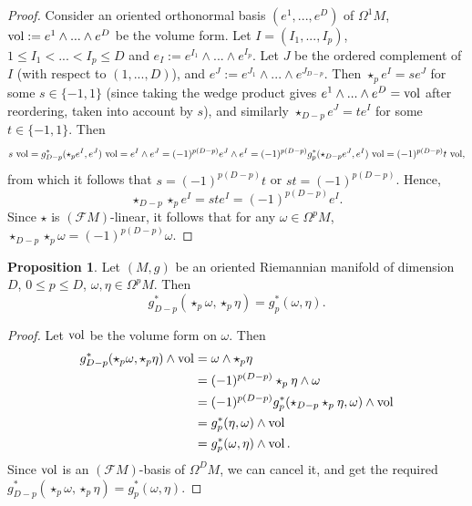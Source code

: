 \documentclass{elsarticle}
\theoremstyle{definition}
\newtheorem{proposition}[theorem]{Proposition}
\newcommand{\vol}{\mathop{\rm vol}\nolimits}
\begin{document}
\begin{proof}
  Consider an oriented orthonormal basis $(e^1, ..., e^D)$ of $\Omega^1 M$, $\vol := e^1 \wedge ... \wedge e^D$ be the volume form.
  Let $I = (I_1, ..., I_p)$, $1 \leq I_1 < ... < I_p \leq D$ and $e_I := e^{I_1} \wedge ... \wedge e^{I_p}$.
  Let $J$ be the ordered complement of $I$ (with respect to $(1, ..., D)$),
  and $e^J := e^{J_1} \wedge ... \wedge e^{J_{D - p}}$.
  Then $\star_p e^I = s e^J$ for some $s \in \{-1, 1\}$ (since taking the wedge product gives $e^1 \wedge ... \wedge e^D = \vol$ after reordering, taken into account by $s$), and similarly $\star_{D - p} e^J = t e^I$ for some $t \in \{-1, 1\}$.
  Then
  \begin{equation}
    s\, \vol
    = g^*_{D - p}(\star_p e^I, e^J)\, \vol = e^I \wedge e^J
    = (-1)^{p (D - p)} e^J \wedge e^I
    = (-1)^{p (D - p)} g^*_p(\star_{D - p} e^J, e^I)\, \vol
    = (-1)^{p (D - p)} t\, \vol,
  \end{equation}
  from which it follows that $s = (-1)^{p (D - p)} t$ or $s t = (-1)^{p (D - p)}$.
  Hence,
  \begin{equation}
    \star_{D - p} \star_p e^I = s t e^I = (-1)^{p (D - p)} e^I.
  \end{equation}
  Since $\star$ is $(\mathcal{F} M)$-linear, it follows that for any $\omega \in \Omega^p M$,
  $\star_{D - p} \star_p \omega = (-1)^{p (D - p)} \omega$.
\end{proof}
\begin{proposition}
  Let $(M, g)$ be an oriented Riemannian manifold of dimension $D$,
  $0 \leq p \leq D$,
  $\omega, \eta \in \Omega^p M$.
  Then
  \begin{equation}
    g^*_{D - p}(\star_p \omega, \star_p \eta) = g^*_p(\omega, \eta).
  \end{equation}
\end{proposition}
\begin{proof}
  Let  $\vol$ be the volume form on $\omega$.
  Then
  \begin{equation}
    \begin{split}
    g^*_{D - p}(\star_p \omega, \star_p \eta) \wedge \vol
    & = \omega \wedge \star_p \eta \\
    & = (-1)^{p (D - p)} \star_p \eta \wedge \omega \\
    & = (-1)^{p (D - p)} g^*_p(\star_{D - p} \star_p \eta, \omega) \wedge \vol \\
    & = g^*_p(\eta, \omega) \wedge \vol \\
    & = g^*_p(\omega, \eta) \wedge \vol.
    \end{split}
  \end{equation}
  Since $\vol$ is an $(\mathcal{F} M)$-basis of $\Omega^D M$, we can cancel it, and get the required
  $g^*_{D - p}(\star_p \omega, \star_p \eta) = g^*_p(\omega, \eta)$.
\end{proof}
\end{document}
